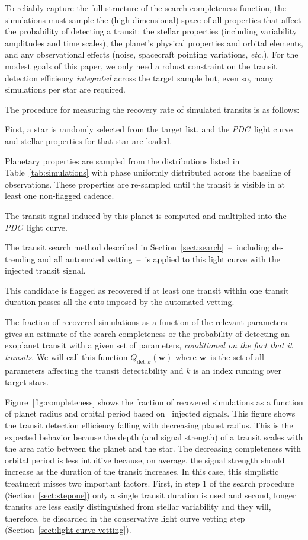 \documentclass[manuscript, letterpaper]{aastex6}
\newcommand{\project}[1]{\textsl{#1}}
\newcommand{\pdc}{\project{PDC}}
\newcommand{\foreign}[1]{\emph{#1}}
\newcommand{\etc}{\foreign{etc.}}
\newcommand{\dfmfigref}[1]{\ref{fig:#1}}
\newcommand{\dfmFig}[1]{Figure~\dfmfigref{#1}}
\newcommand{\dfmfig}[1]{\dfmFig{#1}}
\newcommand{\sectionname}{Section}
\newcommand{\sectref}[1]{\ref{sect:#1}}
\newcommand{\Sect}[1]{\sectionname~\sectref{#1}}
\newcommand{\sect}[1]{\Sect{#1}}
\newcommand{\bvec}[1]{{\ensuremath{\boldsymbol{#1}}}}
\newcommand{\params}{{\ensuremath{\bvec{w}}}}
\begin{document}
To reliably capture the full structure of the search completeness function,
the simulations must sample the (high-dimensional) space of all properties
that affect the probability of detecting a transit: the stellar properties
(including variability amplitudes and time scales), the planet's physical
properties and orbital elements, and any observational effects (noise,
spacecraft pointing variations, \etc).
For the modest goals of this paper, we only need a robust constraint on the
transit detection efficiency \emph{integrated} across the target sample but,
even so, many simulations per star are required.

The procedure for measuring the recovery rate of simulated transits is as
follows:
\begin{enumerate}
{\item First, a star is randomly selected from the target list, and the \pdc\
light curve and stellar properties for that star are loaded.}
{\item Planetary properties are sampled from the distributions listed in
Table~\ref{tab:simulations} with phase uniformly distributed across the
baseline of observations. These properties are re-sampled until the transit is
visible in at least one non-flagged cadence.}
{\item The transit signal induced by this planet is computed and multiplied
into the \pdc\ light curve.}
{\item The transit search method described in \sect{search}~--~including
de-trending and all automated vetting~--~is applied to this light
curve with the injected transit signal.}
{\item This candidate is flagged as recovered if at least one transit within
one transit duration passes all the cuts imposed by the automated vetting.}
\end{enumerate}

The fraction of recovered simulations as a function of the relevant parameters
gives an estimate of the search completeness or the probability of detecting
an exoplanet transit with a given set of parameters, \emph{conditioned on the
fact that it transits}.
We will call this function $Q_{\mathrm{det},k}(\params)$ where \params\ is the
set of all parameters affecting the transit detectability and $k$ is an index
running over target stars.

\dfmfig{completeness} shows the fraction of recovered simulations as a
function of planet radius and orbital period based on \numinjs\ injected
signals.
This figure shows the transit detection efficiency falling with decreasing
planet radius.
This is the expected behavior because the depth (and signal strength) of a
transit scales with the area ratio between the planet and the star.
The decreasing completeness with orbital period is less intuitive because, on
average, the signal strength should increase as the duration of the transit
increases.
In this case, this simplistic treatment misses two important factors.
First, in step 1 of the search procedure (\sect{stepone}) only a single
transit duration is used and second, longer transits are less easily
distinguished from stellar variability and they will, therefore, be discarded
in the conservative light curve vetting step (\sect{light-curve-vetting}).
\end{document}
